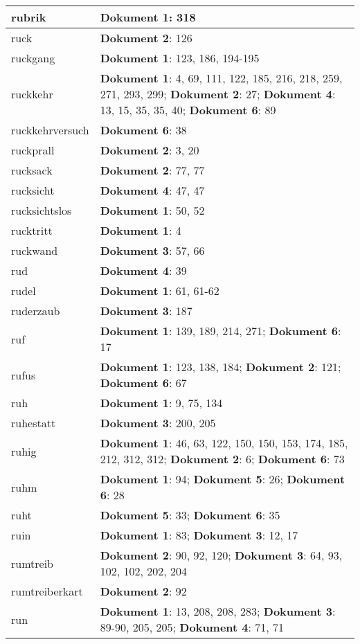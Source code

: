 \documentclass[a5paper]{article}
\begin{document}
\begin{longtable}[l]{|l|p{3in}|}
\hline
rubrik & \textbf{Dokument 1}: 318 \\
\hline
ruck & \textbf{Dokument 2}: 126 \\
\hline
ruckgang & \textbf{Dokument 1}: 123, 186, 194-195 \\
\hline
ruckkehr & \textbf{Dokument 1}: 4, 69, 111, 122, 185, 216, 218, 259, 271, 293, 299; \textbf{Dokument 2}: 27; \textbf{Dokument 4}: 13, 15, 35, 35, 40; \textbf{Dokument 6}: 89 \\
\hline
ruckkehrversuch & \textbf{Dokument 6}: 38 \\
\hline
ruckprall & \textbf{Dokument 2}: 3, 20 \\
\hline
rucksack & \textbf{Dokument 2}: 77, 77 \\
\hline
rucksicht & \textbf{Dokument 4}: 47, 47 \\
\hline
rucksichtslos & \textbf{Dokument 1}: 50, 52 \\
\hline
rucktritt & \textbf{Dokument 1}: 4 \\
\hline
ruckwand & \textbf{Dokument 3}: 57, 66 \\
\hline
rud & \textbf{Dokument 4}: 39 \\
\hline
rudel & \textbf{Dokument 1}: 61, 61-62 \\
\hline
ruderzaub & \textbf{Dokument 3}: 187 \\
\hline
ruf & \textbf{Dokument 1}: 139, 189, 214, 271; \textbf{Dokument 6}: 17 \\
\hline
rufus & \textbf{Dokument 1}: 123, 138, 184; \textbf{Dokument 2}: 121; \textbf{Dokument 6}: 67 \\
\hline
ruh & \textbf{Dokument 1}: 9, 75, 134 \\
\hline
ruhestatt & \textbf{Dokument 3}: 200, 205 \\
\hline
ruhig & \textbf{Dokument 1}: 46, 63, 122, 150, 150, 153, 174, 185, 212, 312, 312; \textbf{Dokument 2}: 6; \textbf{Dokument 6}: 73 \\
\hline
ruhm & \textbf{Dokument 1}: 94; \textbf{Dokument 5}: 26; \textbf{Dokument 6}: 28 \\
\hline
ruht & \textbf{Dokument 5}: 33; \textbf{Dokument 6}: 35 \\
\hline
ruin & \textbf{Dokument 1}: 83; \textbf{Dokument 3}: 12, 17 \\
\hline
rumtreib & \textbf{Dokument 2}: 90, 92, 120; \textbf{Dokument 3}: 64, 93, 102, 102, 202, 204 \\
\hline
rumtreiberkart & \textbf{Dokument 2}: 92 \\
\hline
run & \textbf{Dokument 1}: 13, 208, 208, 283; \textbf{Dokument 3}: 89-90, 205, 205; \textbf{Dokument 4}: 71, 71 \\

\end{longtable}
\end{document}
